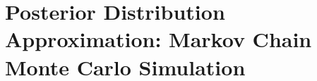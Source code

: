 \section{Posterior Distribution Approximation: Markov Chain Monte Carlo Simulation}\label{sec:bayes_mcmc}